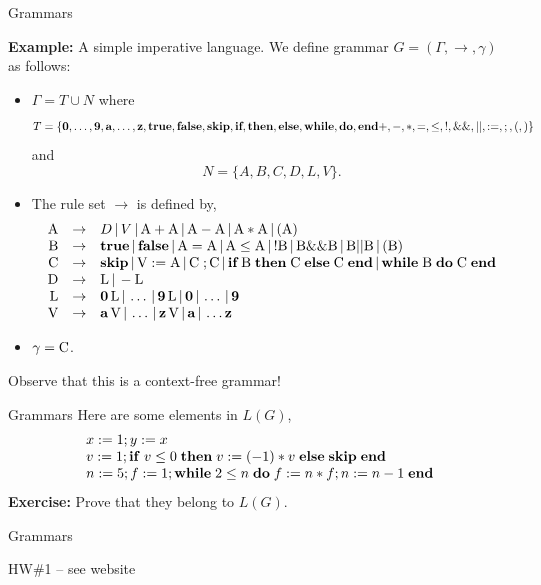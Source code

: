 \documentclass{beamer}
\begin{document}
\begin{frame}[fragile]{Grammars}

\scriptsize
{\bf Example:} A simple imperative language.  We define grammar $G=(\Gamma,\rightarrow,\gamma)$ as follows:
\begin{itemize}
\item $\Gamma = T \cup N$ where
{\tiny
\[
T =\{\mbox{\bf 0},\ldots,\mbox{\bf 9},\mbox{\bf a},\ldots,\mbox{\bf z},\mbox{\bf true},\mbox{\bf false},\mbox{\bf skip},
\mbox{\bf if},\mbox{\bf then},\mbox{\bf else},\mbox{\bf while},\mbox{\bf do},\mbox{\bf end}+,-,*,=,\le,!,\&\&,||,:=,;,(,)\}
\]
}
and
{\tiny
\[
N = \{A,B,C,D,L,V\}.
\]
}
\item The rule set $\rightarrow$ is defined by,
{\tiny
\[
\begin{array}{rcl}
\mbox{A} &\rightarrow& D \,|\, V \,|\, \mbox{A} +\mbox{A} \,|\, \mbox{A} - \mbox{A} \,|\, 
	\mbox{A} * \mbox{A}\,|\, ( \mbox{A} )\\

\mbox{B} &\rightarrow& \mbox{\bf true} \,|\, \mbox{\bf false} \,|\, \mbox{A} = \mbox{A} \,|\,
	\mbox{A} \le \mbox{A} \,|\, ! \mbox{B} \,|\, \mbox{B} \&\& \mbox{B} \,|\, 
	\mbox{B} || \mbox{B} \,|\, (\mbox{B})\\

\mbox{C} &\rightarrow& \mbox{\bf skip} \,|\, \mbox{V} := \mbox{A} \,|\,\mbox{C}\; ; \mbox{C} \,|\,
	\mbox{\bf if} \; \mbox{B}\; \mbox{\bf then}\;\mbox{C}\; \mbox{\bf else}\; \mbox{C} \; \mbox{\bf end}\,|\,
	\mbox{\bf while}\; \mbox{B}\; \mbox{\bf  do}\; \mbox{C}\; \mbox{\bf end}\\

\mbox{D} &\rightarrow& \mbox{L} \,|\, - \mbox{L}\\

\mbox{L} &\rightarrow& \mbox{\bf 0}\, \mbox{L} \,|\, \ldots \,|\,  \mbox{\bf 9} \,\mbox{L} \,|\, \mbox{\bf 0} \,|\, \ldots\,|\,\mbox{\bf 9}\\

\mbox{V} &\rightarrow& \mbox{\bf a}\,\mbox{V} \,|\, \ldots\,|\, \mbox{\bf z}\,\mbox{V} \,|\, \mbox{\bf a} \,|\, \ldots \mbox{\bf z}
\end{array}
\]
}
\item $\gamma =\mbox{C}$.
\end{itemize}

Observe that this is a context-free grammar!
\end{frame}

\begin{frame}{Grammars}
Here are some elements in $L(G)$,
\[
\begin{array}{l}
x := 1 ; y := x\\ 
v := 1; {\bf if}\; {v \le 0}\;{\bf then}\;{v := (-1)*v}\;{\bf else}\;{\mbox{\bf skip}}\;\mbox{\bf end}\\
n := 5 ; f := 1 ; {\bf while}\; {2 \le n}\;{\bf do}\;{f := n*f ; n := n - 1}\; \mbox{\bf end}
\end{array}
\]
{\bf Exercise:} Prove that they belong to $L(G)$.

\end{frame}

\begin{frame}{Grammars}

HW\#1 -- see website

\end{frame}
\end{document}

